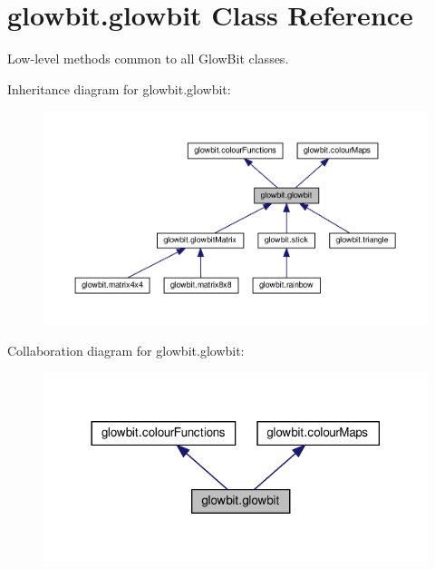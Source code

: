 \hypertarget{classglowbit_1_1glowbit}{}\section{glowbit.\+glowbit Class Reference}
\label{classglowbit_1_1glowbit}


Low-\/level methods common to all Glow\+Bit classes.  




Inheritance diagram for glowbit.\+glowbit\+:\nopagebreak
\begin{figure}[H]
\begin{center}
\leavevmode
\includegraphics[width=350pt]{classglowbit_1_1glowbit__inherit__graph}
\end{center}
\end{figure}


Collaboration diagram for glowbit.\+glowbit\+:\nopagebreak
\begin{figure}[H]
\begin{center}
\leavevmode
\includegraphics[width=318pt]{classglowbit_1_1glowbit__coll__graph}
\end{center}
\end{figure}
